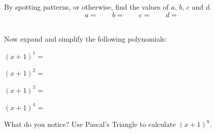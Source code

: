 \documentclass[12pt]{exam}
\begin{document}
By spotting patterns, or otherwise, find the values of $a$, $b$, $c$ and $d$.
$$a =  \qquad b = \qquad c= \qquad d= $$
\

Now expand and simplify the following polynomials:

\vspace{8mm}

$(x+1)^1 = $

\vspace{8mm}

$(x+1)^2 = $

\vspace{12mm}

$(x+1)^3 = $

\vspace{12mm}

$(x+1)^4 = $

\vspace{12mm}

What do you notice? Use Pascal's Triangle to calculate $(x+1)^{8}$.
\end{document}

